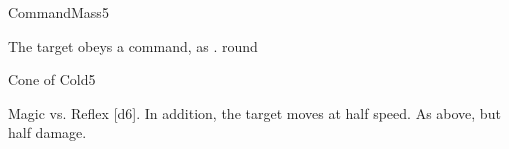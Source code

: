 \begin{spellsection}{Command}{Mass}{5}
\begin{spellheader}
\end{spellheader}
\begin{spellcontent}
    \begin{spelltargetinginfo}
    \end{spelltargetinginfo}
    \begin{spelleffects}
        \spellsuccess The target obeys a command, as .
         round
    \end{spelleffects}
\end{spellcontent}
\begin{spellfooter}
\end{spellfooter}
\end{spellsection}

\begin{spellsection}{Cone of Cold}{5}
\begin{spellheader}
\end{spellheader}
\begin{spellcontent}
    \begin{spelltargetinginfo}
    \end{spelltargetinginfo}
    \begin{spelleffects}
        \begin{spellattack}{Magic vs. Reflex}
            \spellsuccess {}[d6]. In addition, the target moves at half speed.
            \spellfailure As above, but half damage.
        \end{spellattack}
        \spelldur \durshort
    \end{spelleffects}
\end{spellcontent}
\begin{spellfooter}
\end{spellfooter}
\end{spellsection}

